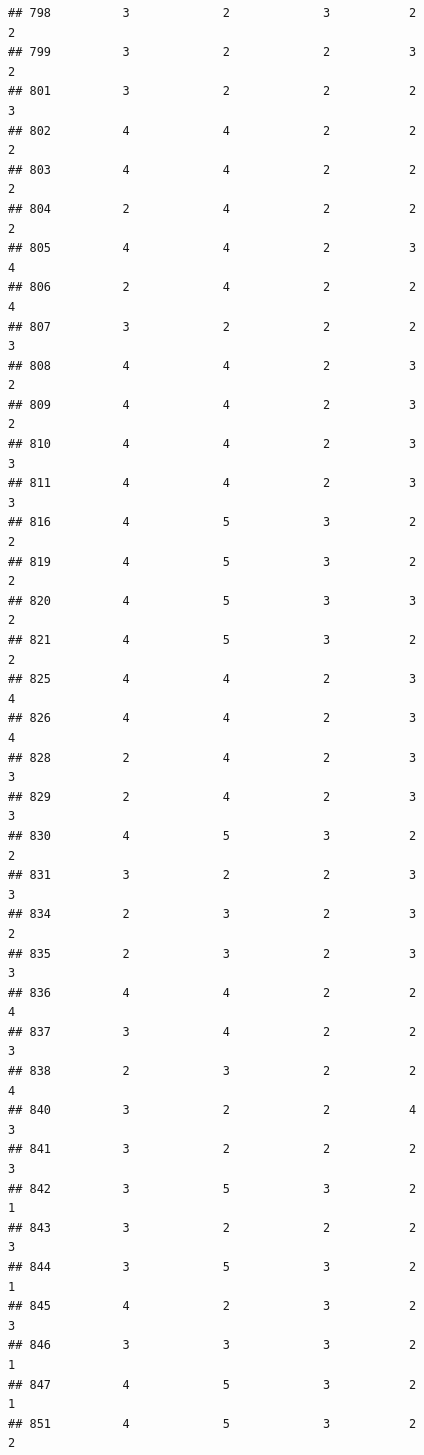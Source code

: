 \documentclass[
]{article}
\begin{document}
\begin{verbatim}
## 798          3             2             3           2             2
## 799          3             2             2           3             2
## 801          3             2             2           2             3
## 802          4             4             2           2             2
## 803          4             4             2           2             2
## 804          2             4             2           2             2
## 805          4             4             2           3             4
## 806          2             4             2           2             4
## 807          3             2             2           2             3
## 808          4             4             2           3             2
## 809          4             4             2           3             2
## 810          4             4             2           3             3
## 811          4             4             2           3             3
## 816          4             5             3           2             2
## 819          4             5             3           2             2
## 820          4             5             3           3             2
## 821          4             5             3           2             2
## 825          4             4             2           3             4
## 826          4             4             2           3             4
## 828          2             4             2           3             3
## 829          2             4             2           3             3
## 830          4             5             3           2             2
## 831          3             2             2           3             3
## 834          2             3             2           3             2
## 835          2             3             2           3             3
## 836          4             4             2           2             4
## 837          3             4             2           2             3
## 838          2             3             2           2             4
## 840          3             2             2           4             3
## 841          3             2             2           2             3
## 842          3             5             3           2             1
## 843          3             2             2           2             3
## 844          3             5             3           2             1
## 845          4             2             3           2             3
## 846          3             3             3           2             1
## 847          4             5             3           2             1
## 851          4             5             3           2             2

\end{verbatim}
\end{document}
